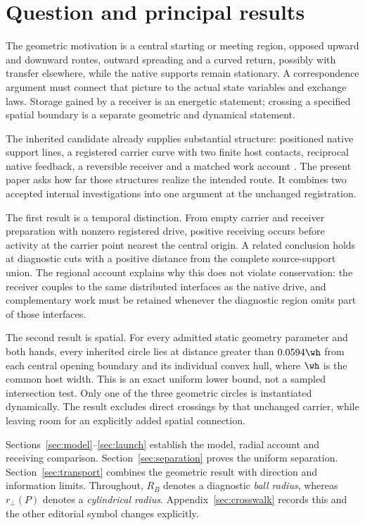 \section{Question and principal results}\label{sec:question}
The geometric motivation is a central starting or meeting region, opposed upward and downward routes, outward spreading and a curved return, possibly with transfer elsewhere, while the native supports remain stationary. A correspondence argument must connect that picture to the actual state variables and exchange laws. Storage gained by a receiver is an energetic statement; crossing a specified spatial boundary is a separate geometric and dynamical statement.

The inherited candidate already supplies substantial structure: positioned native support lines, a registered carrier curve with two finite host contacts, reciprocal native feedback, a reversible receiver and a matched work account \cite{AX,CC,RX,RR}. The present paper asks how far those structures realize the intended route. It combines two accepted internal investigations \cite{CR,SO} into one argument at the unchanged registration.

The first result is a temporal distinction. From empty carrier and receiver preparation with nonzero registered drive, positive receiving occurs before activity at the carrier point nearest the central origin. A related conclusion holds at diagnostic cuts with a positive distance from the complete source-support union. The regional account explains why this does not violate conservation: the receiver couples to the same distributed interfaces as the native drive, and complementary work must be retained whenever the diagnostic region omits part of those interfaces.

The second result is spatial. For every admitted static geometry parameter and both hands, every inherited circle lies at distance greater than $0.0594\wh$ from each central opening boundary and its individual convex hull, where $\wh$ is the common host width. This is an exact uniform lower bound, not a sampled intersection test. Only one of the three geometric circles is instantiated dynamically. The result excludes direct crossings by that unchanged carrier, while leaving room for an explicitly added spatial connection.

Sections~\ref{sec:model}--\ref{sec:launch} establish the model, radial account and receiving comparison. Section~\ref{sec:separation} proves the uniform separation. Section~\ref{sec:transport} combines the geometric result with direction and information limits. Throughout, $R_B$ denotes a diagnostic \emph{ball radius}, whereas $r_\perp(P)$ denotes a \emph{cylindrical radius}. Appendix~\ref{sec:crosswalk} records this and the other editorial symbol changes explicitly.
